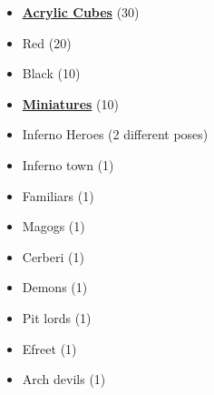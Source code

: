 \begin{multicols}{3}
\begin{itemize}[leftmargin=0pt, label={}, noitemsep, noitemsep]
  \item \textbf{\underline{Acrylic Cubes}} (30)
  \item Red (20)
  \item Black (10)
\end{itemize}

\begin{itemize}[leftmargin=0pt, label={}, noitemsep, noitemsep]
  \item \textbf{\underline{Miniatures}} (10)
  \item Inferno Heroes (2 different poses)
  \item Inferno town (1)
  \item Familiars (1)
  \item Magogs (1)
  \item Cerberi (1)
  \item Demons (1)
  \item Pit lords (1)
  \item Efreet (1)
  \item Arch devils (1)
\end{itemize}


\end{multicols}
